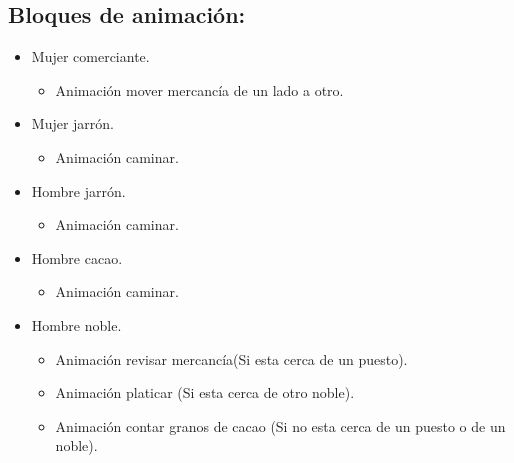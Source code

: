 \subsection{Bloques de animación:}
	\begin{itemize}
		\item Mujer comerciante. 
			\begin{itemize}
				\item Animación mover mercancía de un lado a otro.
			\end{itemize}
		\item Mujer jarrón.
			\begin{itemize}
				\item Animación caminar.
			\end{itemize}			 
		\item Hombre jarrón.
			\begin{itemize}
				\item Animación caminar.
			\end{itemize} 
		\item Hombre cacao.
			\begin{itemize}
				\item Animación caminar.
			\end{itemize}
		\item Hombre noble.
			\begin{itemize}
				\item Animación revisar mercancía(Si esta cerca de un puesto). 
				\item Animación platicar (Si esta cerca de otro noble).
				\item Animación contar granos de cacao (Si no esta cerca de un puesto o de un noble).
			\end{itemize}				
	\end{itemize}	